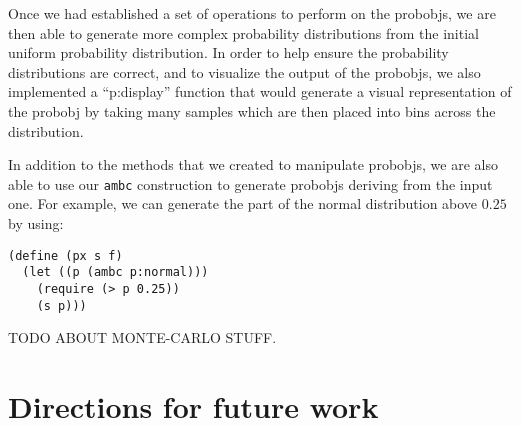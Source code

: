 \documentclass{article}
\begin{document}
Once we had established a set of operations to perform on the probobjs, we are
then able to generate more complex probability distributions from the initial
uniform probability distribution. In order to help ensure the probability
distributions are correct, and to visualize the output of the probobjs, we also
implemented a ``p:display'' function that would generate a visual representation
of the probobj by taking many samples which are then placed into bins across the
distribution.

In addition to the methods that we created to manipulate probobjs, we are also
able to use our \texttt{ambc} construction to generate probobjs deriving from
the input one. For example, we can generate the part of the normal distribution
above $0.25$ by using:\\

\begin{lstlisting}
(define (px s f) 
  (let ((p (ambc p:normal))) 
    (require (> p 0.25))
    (s p)))
\end{lstlisting}

TODO ABOUT MONTE-CARLO STUFF.
\section{Directions for future work}
\end{document}
